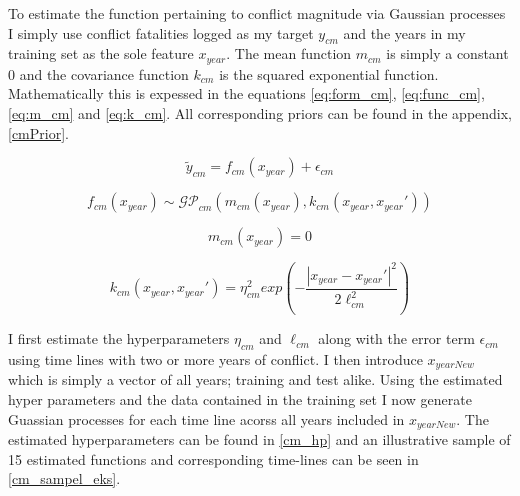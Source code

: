 \documentclass[a4paper]{article}
\begin{document}
To estimate the function pertaining to conflict magnitude via Gaussian processes I simply use conflict fatalities logged as my target $y_{cm}$ and the years in my training set as the sole feature $x_{year}$. The mean function $m_{cm}$ is simply a constant $0$ and the covariance function $k_{cm}$ is the squared exponential function. Mathematically this is expessed in the equations \ref{eq:form_cm}, \ref{eq:func_cm}, \ref{eq:m_cm} and \ref{eq:k_cm}. All corresponding priors can be found in the appendix, \autoref{cmPrior}.\par

\[
\tilde{y}_{cm} = f_{cm}(x_{year}) + \epsilon_{cm} \tag{19} \label{eq:form_cm}
\]

\[
f_{cm}(x_{year}) \sim \mathcal{GP}_{cm}(m_{cm}(x_{year}),k_{cm}(x_{year},x_{year}')) \tag{20} \label{eq:func_cm}
\]

\[
m_{cm}(x_{year}) = 0 \tag{21} \label{eq:m_cm}
\]

\[
k_{cm}(x_{year},x_{year}') = \eta_{cm}^2 exp\left(-\frac{|x_{year}-x_{year}'|^2}{2\ell_{cm}^2}\right) \tag{22} \label{eq:k_cm}
\]

I first estimate the hyperparameters $\eta_{cm}$ and $\ell_{cm}$ along with the error term $\epsilon_{cm}$ using time lines with two or more years of conflict. I then introduce $x_{yearNew}$ which is simply a vector of all years; training and test alike. Using the estimated hyper parameters and the data contained in the training set I now generate Guassian processes for each time line acorss all years included in $x_{yearNew}$. The estimated hyperparameters can be found in \autoref{cm_hp} and an illustrative sample of 15 estimated functions and corresponding time-lines can be seen in \autoref{cm_sampel_eks}.
\end{document}
